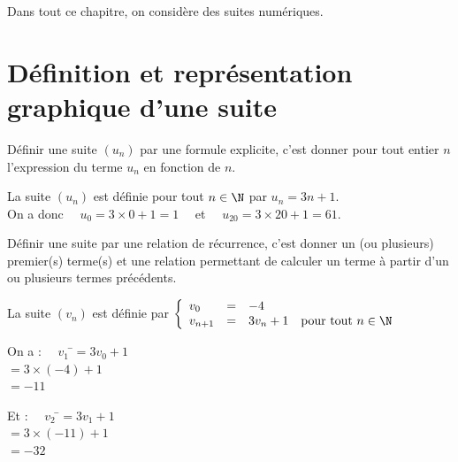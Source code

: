\documentclass[a4paper,11pt,cours]{nsi} %
\begin{document}
Dans tout ce chapitre, on considère des suites numériques.\\

\section{Définition et représentation graphique d'une suite}
\begin{definition}
    Définir une suite $(u_n)$ par une formule explicite, c'est donner pour tout entier $n$ l'expression du terme $u_n$ en fonction de $n$.
\end{definition}

\begin{exemple}[]
    La suite $(u_n)$ est définie pour tout $n\in\N$ par $u_n=3n+1$.\\
    On a donc $\quad u_0=3\times 0+1=1\quad$ et $\quad u_{20}=3\times 20+1=61$.
\end{exemple}

\begin{definition}
    Définir une suite par une relation de récurrence, c'est donner un (ou plusieurs) premier(s) terme(s) et une relation permettant de calculer un terme à partir d'un ou plusieurs termes précédents.
\end{definition}

\begin{exemple}[]
    La suite $(v_n)$ est définie par $\left\{
		\begin{array}{llll}
			v_0 & = & -4 & \\
			v_{n+1} & = & 3v_n+1 & \text{pour tout } n\in\N\\
		\end{array}
    \right. $\\
    \begin{multicols}{2}
        \begin{tabbing}
            On a : $\quad v_1$ \=$=3v_0+1$\\
            \>  $=3\times (-4)+1$\\
            \>  $=-11$
        \end{tabbing}
        \begin{tabbing}
            Et : $\quad v_2$  \=$=3v_1+1$\\
            \>  $=3\times (-11)+1$\\
            \>  $=-32$
        \end{tabbing}
    \end{multicols}
\end{exemple}
\end{document}
